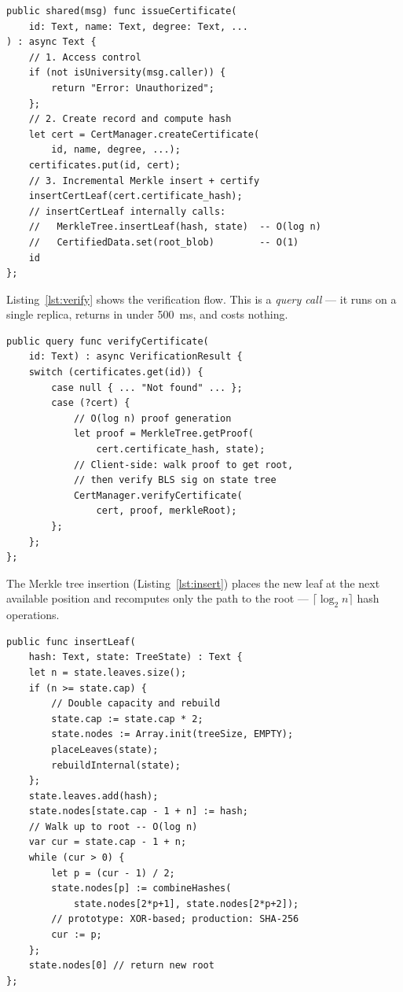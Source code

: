 \documentclass[journal]{IEEEtran}
\begin{document}
\begin{lstlisting}[caption={Simplified issuance flow in Motoko},label={lst:issue},language={}]
public shared(msg) func issueCertificate(
    id: Text, name: Text, degree: Text, ...
) : async Text {
    // 1. Access control
    if (not isUniversity(msg.caller)) {
        return "Error: Unauthorized";
    };
    // 2. Create record and compute hash
    let cert = CertManager.createCertificate(
        id, name, degree, ...);
    certificates.put(id, cert);
    // 3. Incremental Merkle insert + certify
    insertCertLeaf(cert.certificate_hash);
    // insertCertLeaf internally calls:
    //   MerkleTree.insertLeaf(hash, state)  -- O(log n)
    //   CertifiedData.set(root_blob)        -- O(1)
    id
};
\end{lstlisting}

Listing~\ref{lst:verify} shows the verification flow. This is a \emph{query call} — it runs on a single replica, returns in under 500~ms, and costs nothing.

\begin{lstlisting}[caption={Simplified verification flow},label={lst:verify},language={}]
public query func verifyCertificate(
    id: Text) : async VerificationResult {
    switch (certificates.get(id)) {
        case null { ... "Not found" ... };
        case (?cert) {
            // O(log n) proof generation
            let proof = MerkleTree.getProof(
                cert.certificate_hash, state);
            // Client-side: walk proof to get root,
            // then verify BLS sig on state tree
            CertManager.verifyCertificate(
                cert, proof, merkleRoot);
        };
    };
};
\end{lstlisting}

The Merkle tree insertion (Listing~\ref{lst:insert}) places the new leaf at the next available position and recomputes only the path to the root — $\lceil\log_2 n\rceil$ hash operations.

\begin{lstlisting}[caption={Incremental Merkle leaf insertion},label={lst:insert},language={}]
public func insertLeaf(
    hash: Text, state: TreeState) : Text {
    let n = state.leaves.size();
    if (n >= state.cap) {
        // Double capacity and rebuild
        state.cap := state.cap * 2;
        state.nodes := Array.init(treeSize, EMPTY);
        placeLeaves(state);
        rebuildInternal(state);
    };
    state.leaves.add(hash);
    state.nodes[state.cap - 1 + n] := hash;
    // Walk up to root -- O(log n)
    var cur = state.cap - 1 + n;
    while (cur > 0) {
        let p = (cur - 1) / 2;
        state.nodes[p] := combineHashes(
            state.nodes[2*p+1], state.nodes[2*p+2]);
        // prototype: XOR-based; production: SHA-256
        cur := p;
    };
    state.nodes[0] // return new root
};
\end{lstlisting}
\end{document}
